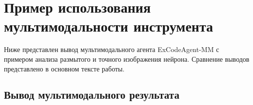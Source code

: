 \chapter{Пример использования мультимодальности инструмента}\label{appendix-multimodal}

Ниже представлен вывод мультимодального агента ExCodeAgent-MM с примером анализа размытого и точного
изображения нейрона. Сравнение выводов представлено в основном тексте работы. 

\begin{figure}
	
\end{figure}

\section{Вывод мультимодального результата}\label{appendix-multimodal:sec1}

